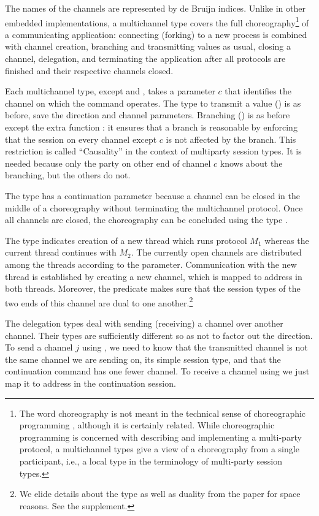 \documentclass[acmsmall,review,anonymous,screen]{acmart}
\begin{document}
The names of the channels are represented by
de Bruijn indices. Unlike in other embedded implementations, a
multichannel type covers the full choreography\footnote{The word
  choreography is not meant in the technical sense of choreographic
  programming \cite{cruz-filipe23:_formal_theor_choreog_progr},
  although it is certainly related. While choreographic programming is
concerned with describing and implementing a multi-party protocol, a
multichannel types give a view of a choreography from a single
participant, i.e., a local type in the terminology of multi-party
session types.} of a communicating
application: connecting (forking) to a new process is combined with channel creation, branching and transmitting values as usual, closing a
channel, delegation, and terminating the application after all
protocols are finished and their respective channels closed.

Each multichannel type, except {\ACconnect} and {\ACterminate}, takes a parameter
$c$ that identifies the channel on which the command operates. 
The type to transmit a value (\ACtransmit) is as before, save the
direction and channel parameters. Branching (\ACbranch) is as before
except the extra function {\ACausality}: it ensures that a branch is
reasonable by enforcing that the session on every channel except $c$
is not affected by the branch. This restriction is called
``Causality'' in the context of multiparty session types. It is needed
because only the party on other end of channel $c$ knows about the
branching, but the others do not.

The {\ACclose} type has a continuation parameter because a channel
can be closed in the middle of a choreography without terminating the
multichannel protocol. Once all channels are closed, the choreography
can be concluded using the type {\ACterminate}.

The type {\ACconnect} indicates creation of a new thread which runs protocol $M_1$
whereas the current thread continues with $M_2$. The currently open
channels are distributed among the threads according to the {\ASplit}
parameter.
Communication with the new thread is established by 
creating a new channel, which is mapped to address {\Azero} in both
threads. Moreover, the {\ACheckDual} predicate makes sure that the
session types of the two ends of this channel are dual to one
another.\footnote{We elide details about the {\ASplit} type as well as
  duality from the paper for space reasons. See the supplement.}

The delegation types deal with sending (receiving) a channel over
another channel. Their types are sufficiently different so as not to
factor out the direction. To send a channel $j$ using {\ACdelegateOUT}, we need to know that
the transmitted channel is not the same channel we are sending on, its simple session type,
and that the continuation command has one fewer channel.
To receive a channel using {\ACdelegateIN} we just map it to address
{\Azero} in the continuation session.
\end{document}
